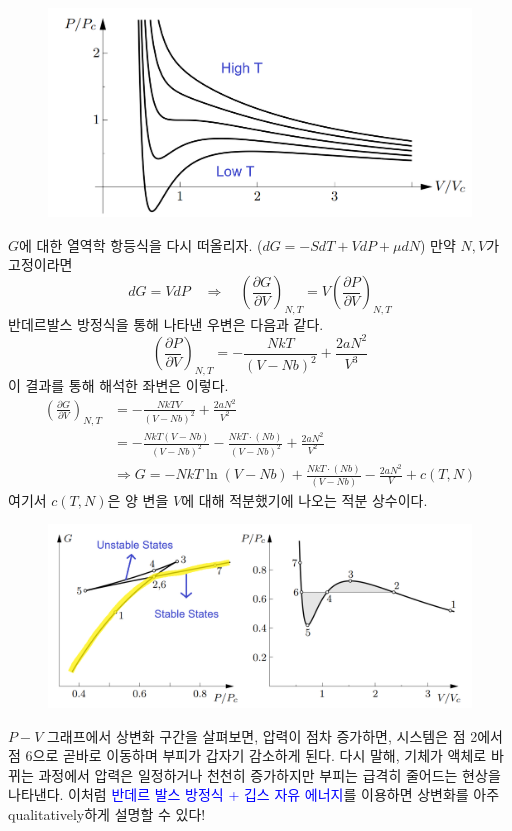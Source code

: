\documentclass{article}
\begin{document}
\begin{figure}[h]
    \centering
    \includegraphics[width=0.55\linewidth]{images/fig3_7.png}
\end{figure}
$G$에 대한 열역학 항등식을 다시 떠올리자. ($dG = -SdT + VdP + \mu dN$) 만약 $N, V$가 고정이라면
\begin{equation}
    dG = VdP \quad \Rightarrow \quad \left( \frac{\partial G}{\partial V} \right)_{N,T} = V \left( \frac{\partial P}{\partial V} \right)_{N,T}
\end{equation}
반데르발스 방정식을 통해 나타낸 우변은 다음과 같다.
\begin{equation}
    \left( \frac{\partial P}{\partial V} \right)_{N,T} = -\frac{NkT}{(V-Nb)^2} + \frac{2aN^2}{V^3}
\end{equation}
이 결과를 통해 해석한 좌변은 이렇다.
\begin{align}
    \left( \frac{\partial G}{\partial V} \right)_{N,T} &= -\frac{NkTV}{(V-Nb)^2} + \frac{2aN^2}{V^2}\\
    &= -\frac{NkT(V-Nb)}{(V-Nb)^2} - \frac{NkT\cdot(Nb)}{(V-Nb)^2} + \frac{2aN^2}{V^2}\\
    &\Rightarrow  G = -NkT \ln (V-Nb) + \frac{NkT\cdot(Nb)}{(V-Nb)} - \frac{2aN^2}{V} + c(T,N)
\end{align}
여기서 $c(T,N)$은 양 변을 $V$에 대해 적분했기에 나오는 적분 상수이다.

\begin{figure}[h]
    \centering
    \includegraphics[width=0.75\linewidth]{images/fig3_8.png}
\end{figure}

$P-V$ 그래프에서 상변화 구간을 살펴보면, 압력이 점차 증가하면, 시스템은 점 2에서 점 6으로 곧바로 이동하며 부피가 갑자기 감소하게 된다. 다시 말해, 기체가 액체로 바뀌는 과정에서 압력은 일정하거나 천천히 증가하지만 부피는 급격히 줄어드는 현상을 나타낸다. 이처럼 \textcolor{blue}{반데르 발스 방정식 + 깁스 자유 에너지}를 이용하면 상변화를 아주 qualitatively하게 설명할 수 있다! 
\end{document}
